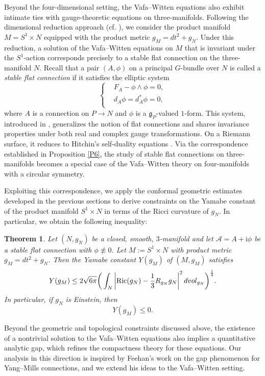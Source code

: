 \documentclass[12pt, twoside]{article}
\newtheorem{theorem}{Theorem}[section]
\theoremstyle{definition}
\numberwithin{equation}{section}
\begin{document}
Beyond the four-dimensional setting, the Vafa--Witten equations also exhibit intimate ties with gauge-theoretic equations on three-manifolds. Following the dimensional reduction approach (cf. \cite{Hua22,Mar10,Wit12}), we consider the product manifold \(M = S^1 \times N\) equipped with the product metric \(g_{M}= dt^2 + g_N\). Under this reduction, a solution of the Vafa--Witten equations on \(M\) that is invariant under the \(S^1\)-action corresponds precisely to a stable flat connection on the three-manifold \(N\). Recall that a pair \((A, \phi)\) on a principal \(G\)-bundle over \(N\) is called a \emph{stable flat connection} if it satisfies the elliptic system
\begin{equation}\label{E11}
\left\{
\begin{split}
&F_{A}-\phi\wedge\phi=0,\\
&d_{A}\phi=d_{A}^{\ast}\phi=0,\\
\end{split}
\right.
\end{equation}
where \(A\) is a connection on \(P \to N\) and \(\phi\) is a \(\mathfrak{g}_P\)-valued \(1\)-form. This system, introduced in \cite{Cor88, GU12}, generalizes the notion of flat connections and shares invariance properties under both real and complex gauge transformations. On a Riemann surface, it reduces to Hitchin's self-duality equations \cite{Hit87}. Via the correspondence established in Proposition \ref{P6}, the study of stable flat connections on three-manifolds becomes a special case of the Vafa--Witten theory on four-manifolds with a circular symmetry.

Exploiting this correspondence, we apply the conformal geometric estimates developed in the previous sections to derive constraints on the Yamabe constant of the product manifold \(S^1 \times N\) in terms of the Ricci curvature of \(g_N\). In particular, we obtain the following inequality:
\begin{theorem}\label{T5}
Let $(N,g_{N})$ be a closed, smooth, $3$-manifold and let $\mathcal{A}=A+\mathrm{i}\phi$ be a stable flat connection with $\phi\not\equiv0$. Let $M:=S^{1}\times N$ with product metric $g_{M}=dt^{2}+g_{N}$. Then the Yamabe constant $Y(g_{M})$ of $(M,g_{M})$ satisfies
	\begin{equation*}
	Y(g_{M})\leq2\sqrt{6\pi}\bigg{(}\int_{N}\left|\mathrm{Ric}(g_{N})-\frac{1}{3}R_{g_{N}}g_{N}\right|^{2}dvol_{g_{N}}\bigg{)}^{\frac{1}{2}}.
	\end{equation*}
In particular, if $g_{N}$ is Einstein, then
$$Y(g_{M})\leq 0.$$
\end{theorem}
Beyond the geometric and topological constraints discussed above, the existence of a nontrivial solution to the Vafa--Witten equations also implies a quantitative analytic gap, which refines the compactness theory for these equations. Our analysis in this direction is inspired by Feehan's work \cite{Fee16} on the gap phenomenon for Yang–Mills connections, and we extend his ideas to the Vafa--Witten setting.
\end{document}
